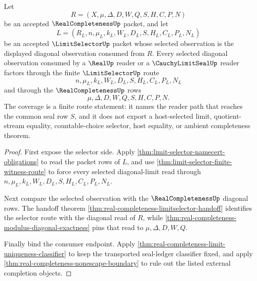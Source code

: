 \begin{theorem}
\label{thm:real-completeness-selector-route-coverage}
Let
$$
R=(X,\mu,\Delta,D,W,Q,S,H,C,P,N)
$$
be an accepted $\RealCompletenessUp$ packet, and let
$$
L=(R_L,n,\mu_L,k_L,W_L,D_L,S,H_L,C_L,P_L,N_L)
$$
be an accepted $\LimitSelectorUp$ packet whose selected observation is the displayed diagonal observation consumed from $R$. Every selected diagonal observation consumed by a $\RealUp$ reader or a $\CauchyLimitSealUp$ reader factors through the finite $\LimitSelectorUp$ route
$$
n,\mu_L,k_L,W_L,D_L,S,H_L,C_L,P_L,N_L
$$
and through the $\RealCompletenessUp$ rows
$$
\mu,\Delta,D,W,Q,S,H,C,P,N.
$$
The coverage is a finite route statement: it names the reader path that reaches the common seal row $S$, and it does not export a host-selected limit, quotient-stream equality, countable-choice selector, host equality, or ambient completeness theorem.
\end{theorem}
\begin{proof}
First expose the selector side. Apply \autoref{thm:limit-selector-namecert-obligations} to read the packet rows of $L$, and use \autoref{thm:limit-selector-finite-witness-route} to force every selected diagonal-limit read through $n,\mu_L,k_L,W_L,D_L,S,H_L,C_L,P_L,N_L$.

Next compare the selected observation with the $\RealCompletenessUp$ diagonal rows. The handoff theorem \autoref{thm:real-completeness-limitselector-handoff} identifies the selector route with the diagonal read of $R$, while \autoref{thm:real-completeness-modulus-diagonal-exactness} pins that read to $\mu,\Delta,D,W,Q$.

Finally bind the consumer endpoint. Apply \autoref{thm:real-completeness-limit-uniqueness-classifier} to keep the transported seal-ledger classifier fixed, and apply \autoref{thm:real-completeness-nonescape-boundary} to rule out the listed external completion objects.
\end{proof}

